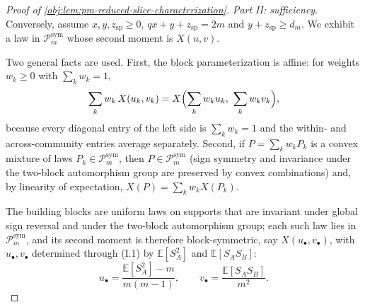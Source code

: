\begin{proof}[Proof of \cref{obj:lem:pm-reduced-slice-characterization}]
\emph{Part II: sufficiency.}  Conversely, assume \(x,y,z_{\mathrm{sp}}\ge0\), \(qx+y+z_{\mathrm{sp}}=2m\) and \(y+z_{\mathrm{sp}}\ge d_m\).  We exhibit a law in \(\mathcal P_m^{\mathrm{sym}}\) whose second moment is \(X(u,v)\).

Two general facts are used.  First, the block parameterization is affine: for weights \(w_k\ge0\) with \(\sum_kw_k=1\),
\[
\sum_k w_k\,X(u_k,v_k)=X\Bigl(\sum_k w_ku_k,\ \sum_k w_kv_k\Bigr),
\]
because every diagonal entry of the left side is \(\sum_kw_k=1\) and the within- and across-community entries average separately. %
Second, if \(P=\sum_kw_kP_k\) is a convex mixture of laws \(P_k\in\mathcal P_m^{\mathrm{sym}}\), then \(P\in\mathcal P_m^{\mathrm{sym}}\) (sign symmetry and invariance under the two-block automorphism group are preserved by convex combinations) and, by linearity of expectation, \(X(P)=\sum_kw_kX(P_k)\). %

The building blocks are uniform laws on supports that are invariant under global sign reversal and under the two-block automorphism group; each such law lies in \(\mathcal P_m^{\mathrm{sym}}\), and its second moment is therefore block-symmetric, say \(X(u_\bullet,v_\bullet)\), with \(u_\bullet,v_\bullet\) determined through (I.1) by \(\mathbb E[S_A^2]\) and \(\mathbb E[S_AS_B]\):
\[
u_\bullet=\frac{\mathbb E[S_A^2]-m}{m(m-1)},
\qquad
v_\bullet=\frac{\mathbb E[S_AS_B]}{m^2}.
\]


\end{proof}
